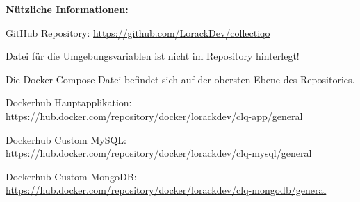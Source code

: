 \textbf{Nützliche Informationen:}\par
\vspace{0.5cm}
GitHub Repository: \url{https://github.com/LorackDev/collectiqo}\par
Datei für die Umgebungsvariablen ist nicht im Repository hinterlegt!\par
Die Docker Compose Datei befindet sich auf der obersten Ebene des Repositories.\par

\vspace{0.5cm}
Dockerhub Hauptapplikation: \url{https://hub.docker.com/repository/docker/lorackdev/clq-app/general}\par
Dockerhub Custom MySQL: \url{https://hub.docker.com/repository/docker/lorackdev/clq-mysql/general}\par
Dockerhub Custom MongoDB: \url{https://hub.docker.com/repository/docker/lorackdev/clq-mongodb/general}\par